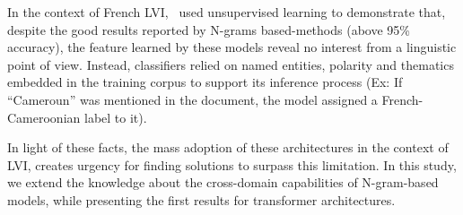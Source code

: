 In the context of French LVI,~\citet{diwersy2014weakly} used unsupervised learning to demonstrate that, despite the good results reported by N-grams based-methods (above 95\% accuracy), the feature learned by these models reveal no interest from a linguistic point of view. Instead, classifiers relied on named entities, polarity and thematics embedded in the training corpus to support its inference process (Ex: If ``Cameroun'' was mentioned in the document, the model assigned a French-Cameroonian label to it). 

In light of these facts, the mass adoption of these architectures in the context of LVI, creates urgency for finding solutions to surpass this limitation. In this study, we extend the knowledge about the cross-domain capabilities of N-gram-based models, while presenting the first results for transformer architectures.
